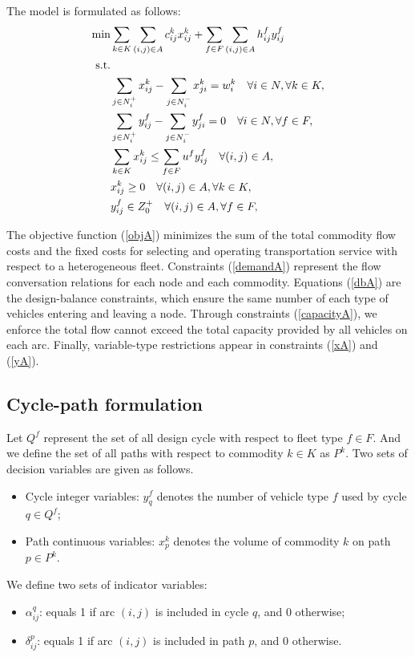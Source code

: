 \documentclass[11pt,nonblindrev,fleqn]{article}
\begin{document}
The model is formulated as follows:
\begin{align}
  \min &  \sum_{k\in K}\sum_{(i,j)\in A} c_{ij}^k x_{ij}^k + \sum_{f\in F}\sum_{(i,j)\in A}h_{ij}^f y_{ij}^f   \label{objA}  \\
  \rm{s.t.} \nonumber  \\
         &  \sum_{j\in N_i^+}x_{ij}^k - \sum_{j\in N_i^-}x_{ji}^k = w_i^k     \quad     \forall i\in N, \forall k\in K,     \label{demandA}  \\
         &   \sum_{j\in N_i^+}y_{ij}^f - \sum_{j\in N_i^-}y_{ji}^f = 0  \quad     \forall i\in N, \forall f\in F,   \label{dbA} \\
         &   \sum_{k\in K}x_{ij}^k \leq \sum_{f\in F}u^f y_{ij}^f  \quad  \forall (i,j)\in A,   \label{capacityA} \\
         &    x_{ij}^k \geq 0  \quad  \forall (i,j)\in A, \forall k\in K,   \label{xA} \\
         &   y_{ij}^f \in Z_0^+  \quad  \forall (i,j)\in A,\forall f\in F, \label{yA}
\end{align}

The objective function (\ref{objA}) minimizes the sum of the total commodity flow costs and the fixed costs for selecting and operating transportation service with respect to a heterogeneous fleet. Constraints (\ref{demandA}) represent the flow conversation relations for each node and each commodity. Equations (\ref{dbA}) are the design-balance constraints, which ensure the same number of each type of vehicles entering and leaving a node. Through constraints (\ref{capacityA}), we enforce the total flow cannot exceed the total capacity provided by all vehicles on each arc. Finally, variable-type restrictions appear in constraints (\ref{xA}) and (\ref{yA}).

\subsection{Cycle-path formulation}
Let $Q^f$ represent the set of all design cycle with respect to fleet type $f\in F$. And we define the set of all paths with respect to commodity $k\in K$ as $P^k$. Two sets of decision variables are given as follows.
\begin{itemize}
  \item Cycle integer variables: $y_q^f$ denotes the number of vehicle type $f$ used by cycle $q\in Q^f$;
  \item Path continuous variables: $x_p^k$ denotes the volume of commodity $k$ on path $p\in P^k$.
\end{itemize}
We define two sets of indicator variables:
\begin{itemize}
  \item $\alpha_{ij}^q$: equals 1 if arc $(i,j)$ is included in cycle $q$, and 0 otherwise;
  \item $\delta_{ij}^p$: equals 1 if arc $(i,j)$ is included in path $p$, and 0 otherwise.
\end{itemize}
\end{document}
